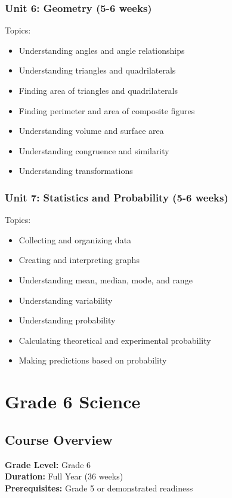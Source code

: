 \documentclass[11pt,letterpaper]{report}
\begin{document}
\subsection{Unit 6: Geometry (5-6 weeks)}

Topics:
\begin{itemize}
\item Understanding angles and angle relationships
\item Understanding triangles and quadrilaterals
\item Finding area of triangles and quadrilaterals
\item Finding perimeter and area of composite figures
\item Understanding volume and surface area
\item Understanding congruence and similarity
\item Understanding transformations
\end{itemize}

\subsection{Unit 7: Statistics and Probability (5-6 weeks)}

Topics:
\begin{itemize}
\item Collecting and organizing data
\item Creating and interpreting graphs
\item Understanding mean, median, mode, and range
\item Understanding variability
\item Understanding probability
\item Calculating theoretical and experimental probability
\item Making predictions based on probability
\end{itemize}

\chapter{Grade 6 Science}

\section{Course Overview}

\textbf{Grade Level:} Grade 6\\
\textbf{Duration:} Full Year (36 weeks)\\
\textbf{Prerequisites:} Grade 5 or demonstrated readiness
\end{document}
